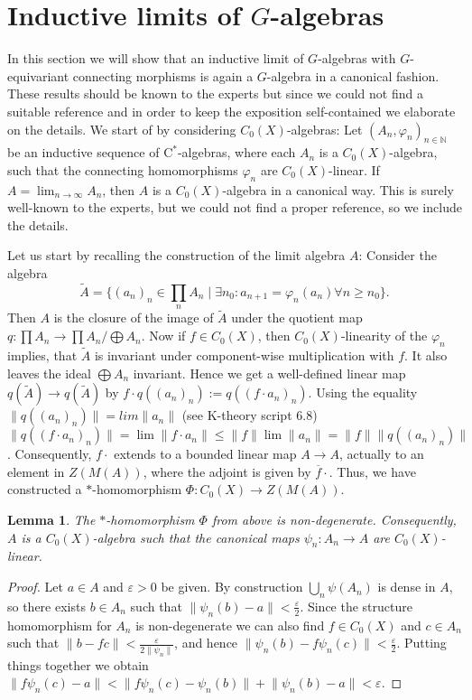 \documentclass[reqno,oneside,a4paper,11pt]{amsart}
\theoremstyle{theorem}
\newtheorem{lemma}[satz]{Lemma}
\theoremstyle{definition}
\newcommand{\norm}[1]{\lVert#1\rVert}   %
\newcommand{\NN}{\mathbb N}
\begin{document}
	\section{Inductive limits of $G$-algebras}
	In this section we will show that an inductive limit of $G$-algebras with $G$-equivariant connecting morphisms is again a $G$-algebra in a canonical fashion. These results should be known to the experts but since we could not find a suitable reference and in order to keep the exposition self-contained we elaborate on the details. We start of by considering $C_0(X)$-algebras:
	Let $(A_n,\varphi_n)_{n\in\NN}$ be an inductive sequence of $\mathrm{C}^*$-al\-gebras, where each $A_n$ is a $C_0(X)$-algebra, such that the connecting homomorphisms $\varphi_n$ are $C_0(X)$-linear.
	If $A=\lim_{n\rightarrow\infty}A_n$, then $A$ is a $C_0(X)$-algebra in a canonical way. This is surely well-known to the experts, but we could not find a proper reference, so we include the details.
	
	Let us start by recalling the construction of the limit algebra $A$:
	Consider the algebra $$\widetilde{A}=\lbrace (a_n)_n\in\prod\limits_{n}A_n\mid \exists n_0: a_{n+1}=\varphi_n(a_n)\forall n\geq n_0\rbrace.$$
	Then $A$ is the closure of the image of $\widetilde{A}$ under the quotient map $q:\prod A_n\rightarrow \prod A_n/\bigoplus A_n$.
	Now if $f\in C_0(X)$, then $C_0(X)$-linearity of the $\varphi_n$ implies, that $\widetilde{A}$ is invariant under component-wise multiplication with $f$. It also leaves the ideal $\bigoplus A_n$ invariant. Hence we get a well-defined linear map
	$q(\widetilde{A})\rightarrow q(\widetilde{A})$ by $f\cdot q((a_n)_n):=q((f\cdot a_n)_n)$. Using the equality $\norm{q((a_n)_n)}=lim \norm{a_n}$ (see K-theory script 6.8)
	$\norm{q((f\cdot a_n)_n)}=\lim \norm{f\cdot a_n}\leq \norm{f}\lim \norm{a_n}=\norm{f}\norm{q((a_n)_n)}$. Consequently, $f\cdot$ extends to a bounded linear map $A\rightarrow A$, actually to an element in $Z(M(A))$, where the adjoint is given by $\overline{f}\cdot$. Thus, we have constructed a $*$-homomorphism $\Phi:C_0(X)\rightarrow Z(M(A))$. 
	\begin{lemma}\label{Lem:InductiveLimitsOfC_0(X)-algebras}
		The $*$-homomorphism $\Phi$ from above is non-degener\-ate. Consequently, $A$ is a $C_0(X)$-algebra such that the canonical maps $\psi_n:A_n\rightarrow A$ are $C_0(X)$-linear.
	\end{lemma}
	\begin{proof}
		Let $a\in A$ and $\varepsilon>0$ be given. By construction $\bigcup_n \psi(A_n)$ is dense in $A$, so there exists $b\in A_n$ such that $\norm{\psi_n(b)-a}<\frac{\varepsilon}{2}$. Since the structure homomorphism for $A_n$ is non-degenerate we can also find $f\in C_0(X)$ and $c\in A_n$ such that $\norm{b-fc}< \frac{\varepsilon}{2\norm{\psi_n}}$, and hence $\norm{\psi_n(b)-f\psi_n(c)}<\frac{\varepsilon}{2}$.
		Putting things together we obtain
		$\norm{f\psi_n(c)-a}<\norm{f\psi_n(c)-\psi_n(b)}+\norm{\psi_n(b)-a}<\varepsilon$.
	\end{proof}
	
\end{document}
